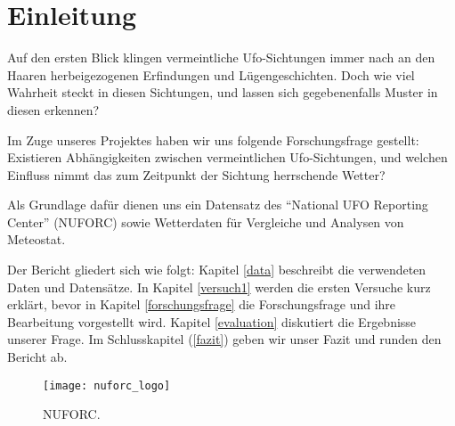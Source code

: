 \section{Einleitung} \label{einleitung}

Auf den ersten Blick klingen vermeintliche Ufo-Sichtungen immer nach an den Haaren herbeigezogenen Erfindungen und Lügengeschichten. Doch wie viel Wahrheit steckt in diesen Sichtungen, und lassen sich gegebenenfalls Muster in diesen erkennen?

Im Zuge unseres Projektes haben wir uns folgende Forschungsfrage gestellt: Existieren Abhängigkeiten zwischen vermeintlichen Ufo-Sichtungen, und welchen Einfluss nimmt das zum Zeitpunkt der Sichtung herrschende Wetter?

Als Grundlage dafür dienen uns ein Datensatz des \enquote{National UFO Reporting Center} (NUFORC)\cite{nuforc:2021} sowie Wetterdaten für Vergleiche und Analysen von Meteostat\cite{meteostat:2021}.

Der Bericht gliedert sich wie folgt: Kapitel \ref{data} beschreibt die verwendeten Daten und Datensätze. In Kapitel \ref{versuch1} werden die ersten Versuche kurz erklärt, bevor in Kapitel \ref{forschungsfrage} die Forschungsfrage und ihre Bearbeitung vorgestellt wird. Kapitel \ref{evaluation} diskutiert die Ergebnisse unserer Frage. Im Schlusskapitel (\ref{fazit}) geben wir unser Fazit und runden den Bericht ab.

\begin{figure}[t]
    \centering
    \texttt{[image: nuforc\_logo]}
    \caption{NUFORC.}
    \label{fig:nuforc}
\end{figure}